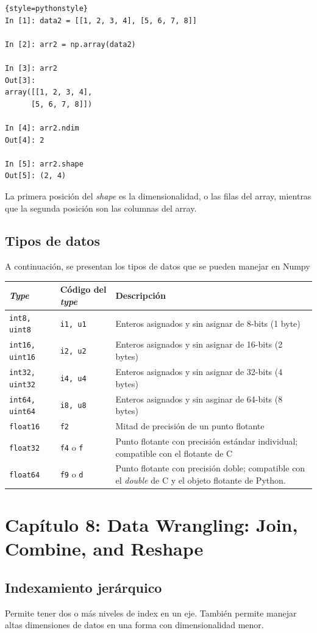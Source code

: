 \documentclass{article}
\begin{document}
\begin{lstlisting}{style=pythonstyle}
In [1]: data2 = [[1, 2, 3, 4], [5, 6, 7, 8]]

In [2]: arr2 = np.array(data2)

In [3]: arr2
Out[3]:
array([[1, 2, 3, 4],
      [5, 6, 7, 8]])

In [4]: arr2.ndim
Out[4]: 2

In [5]: arr2.shape
Out[5]: (2, 4)
\end{lstlisting}

La primera posición del \textit{shape} es la dimensionalidad, o las filas del array, mientras que la segunda posición son las columnas del array.

\subsection{Tipos de datos}

A continuación, se presentan los tipos de datos que se pueden manejar en Numpy


\begin{longtable}{|C{0.25\textwidth}|C{0.25\textwidth}|C{0.4\textwidth}|}
  \hline
  \textbf{\textit{Type}} & \textbf{Código del \textit{type}} & \textbf{Descripción} \\ \hline
  \texttt{int8, uint8} & \texttt{i1, u1} & Enteros asignados y sin asignar de 8-bits (1 byte) \\ \hline
  \texttt{int16, uint16} & \texttt{i2, u2} & Enteros asignados y sin asignar de 16-bits (2 bytes) \\ \hline
  \texttt{int32, uint32} & \texttt{i4, u4} & Enteros asignados y sin asignar de 32-bits (4 bytes) \\ \hline
  \texttt{int64, uint64} & \texttt{i8, u8} & Enteros asignados y sin asginar de 64-bits (8 bytes) \\ \hline
  \texttt{float16} & \texttt{f2} & Mitad de precisión de un punto flotante \\ \hline
  \texttt{float32} & \texttt{f4} o \texttt{f} & Punto flotante con precisión estándar individual; compatible con el flotante de C \\ \hline
  \texttt{float64} & \texttt{f9} o \texttt{d} & Punto flotante con precisión doble; compatible con el \textit{double} de C y el objeto flotante de Python. \\ \hline
\end{longtable}


\section{Capítulo 8: Data Wrangling: Join, Combine, and Reshape}

\subsection{Indexamiento jerárquico}

Permite tener dos o más niveles de index en un eje. También permite manejar altas dimensiones de datos en una forma con dimensionalidad menor.
\end{document}
